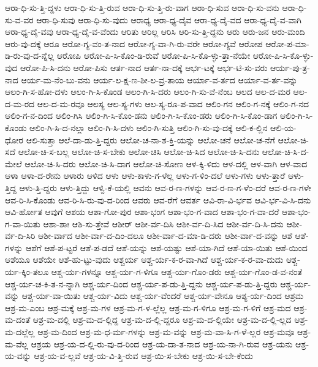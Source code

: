 {ಆರಾ-ಧಿ-ಸು-ತ್ತಿ-ದ್ದಳು
ಆರಾ-ಧಿ-ಸು-ತ್ತಿ-ರುವ
ಆರಾ-ಧಿ-ಸು-ತ್ತಿ-ರು-ವಾಗ
ಆರಾ-ಧಿ-ಸುವ
ಆರಾ-ಧಿ-ಸು-ವನು
ಆರಾ-ಧಿ-ಸು-ವ-ವರ
ಆರಾ-ಧಿ-ಸುವು
ಆರಾ-ಧಿ-ಸು-ವುದು
ಆರಾಧ್ಯ
ಆರಾ-ಧ್ಯ-ದೈವ
ಆರಾ-ಧ್ಯ-ದೈ-ವದ
ಆರಾ-ಧ್ಯ-ದೈ-ವ-ವಾಗಿ
ಆರಾ-ಧ್ಯ-ದೈ-ವವು
ಆರಾ-ಧ್ಯ-ದೈ-ವ-ವೆಂದು
ಆರಿತು
ಆರಿಲ್ಲ
ಆರಿಸಿ
ಆರಿ-ಸು-ತ್ತಿ-ದ್ದನು
ಆರು
ಆರು-ಜನ
ಆರು-ಮಂದಿ
ಆರು-ವು-ದಕ್ಕೆ
ಆರೂ
ಆರೋ-ಗ್ಯ-ವಂ-ತ-ನಾದ
ಆರೋ-ಗ್ಯ-ವಾ-ಗಿ-ರು-ವರೇ
ಆರೋ-ಗ್ಯವೆ
ಆರೋಪ
ಆರೋ-ಪ-ಮಾ-ಡಿ-ರು-ವು-ದ-ನ್ನೆಲ್ಲ
ಆರೋಪಿ
ಆರೋ-ಪಿ-ಸಿ-ಕೊಂ-ಡಿ-ರುವೆ
ಆರೋ-ಪಿ-ಸಿ-ಕೊ-ಳ್ಳು-ತ್ತಾ-ನೆಯೇ
ಆರೋ-ಪಿ-ಸಿ-ಕೊ-ಳ್ಳು-ವುದ
ಆರೋ-ಪಿ-ಸಿ-ದನು
ಆರೋ-ಪಿಸು
ಆರ್ತ-ನಾದ
ಆರ್ತ-ನಾ-ದಕ್ಕೆ
ಆರ್ಭ-ಟಕ್ಕೆ
ಆರ್ಭ-ಟಿ-ಸು-ವರು
ಆರ್ಯ-ಪು-ತ್ರ-ನಾದ
ಆರ್ಯ-ಮ-ನೆಂ-ಬು-ವನು
ಆರ್ಯ-ಲ-ಕ್ಷ-ಣ-ಶೀ-ಲ-ವ್ರ-ತಾಯ
ಆರ್ಯಾ-ವ-ರ್ತದ
ಆರ್ಯಾ-ವ-ರ್ತ-ವನ್ನು
ಆಲಂ-ಗಿ-ಸ-ಹೋ-ದಳು
ಆಲಂ-ಗಿ-ಸಿ-ಕೊಂಡ
ಆಲಂ-ಗಿ-ಸಿ-ದರು
ಆಲಂ-ಗಿ-ಸು-ವೆ-ನೆಂಬ
ಆಲದ
ಆಲ-ದ-ಮರ
ಆಲ-ದ-ಮ-ರದ
ಆಲ-ದ-ಮ-ರವೂ
ಆಲಸ್ಯ
ಆಲ-ಸ್ಯ-ಗಳು
ಆಲ-ಸ್ಯ-ರೂ-ಪ-ವಾದ
ಆಲಿಂ-ಗನ
ಆಲಿಂ-ಗ-ನಕ್ಕೆ
ಆಲಿಂ-ಗ-ನದ
ಆಲಿಂ-ಗ-ನ-ದಿಂದ
ಆಲಿಂ-ಗಿಸಿ
ಆಲಿಂ-ಗಿ-ಸಿ-ಕೊಂ-ಡನು
ಆಲಿಂ-ಗಿ-ಸಿ-ಕೊಂ-ಡರು
ಆಲಿಂ-ಗಿ-ಸಿ-ಕೊಂ-ಡಾಗ
ಆಲಿಂ-ಗಿ-ಸಿ-ಕೊಂಡು
ಆಲಿಂ-ಗಿ-ಸಿ-ದ-ನಲ್ಲಾ
ಆಲಿಂ-ಗಿ-ಸಿ-ದಳು
ಆಲಿಂ-ಗಿ-ಸುತ್ತಿ
ಆಲಿಂ-ಗಿ-ಸು-ವು-ದಕ್ಕೆ
ಆಲಿ-ಕ-ಲ್ಲಿನ
ಆಲಿ-ಯ-ಧೋರ
ಆಲಿ-ಸುತ್ತಾ
ಆಲೆ-ದಾ-ಡು-ತ್ತಿ-ದ್ದರು
ಆಲೋ-ಚ-ನಾ-ಶ-ಕ್ತಿ-ಯನ್ನು
ಆಲೋ-ಚನೆ
ಆಲೋ-ಚ-ನೆಗೆ
ಆಲೋ-ಚಿ-ಸದೆ
ಆಲೋ-ಚಿ-ಸ-ಬಲ್ಲ
ಆಲೋ-ಚಿ-ಸ-ಬೇಕು
ಆಲೋ-ಚಿಸಿ
ಆಲೋ-ಚಿ-ಸಿದ
ಆಲೋ-ಚಿ-ಸಿ-ದನು
ಆಲೋ-ಚಿ-ಸಿ-ದ-ಮೇಲೆ
ಆಲೋ-ಚಿ-ಸಿ-ದರು
ಆಲೋ-ಚಿ-ಸಿ-ದಾಗ
ಆಲೋ-ಚಿ-ಸೋಣ
ಆಳ-ಕ್ಕಿ-ಳಿದು
ಆಳ-ದಲ್ಲಿ
ಆಳ-ವಾಗಿ
ಆಳ-ವಾದ
ಆಳಾ
ಆಳಾ-ದ-ರೇನು
ಆಳಾರು
ಆಳಿದ
ಆಳು
ಆಳು-ಕಾಳು-ಗ-ಳೆಲ್ಲ
ಆಳು-ಗ-ಳಿಂ-ದಲೆ
ಆಳು-ಗಳು
ಆಳು-ತ್ತಾರೆ
ಆಳು-ತ್ತಿದ್ದ
ಆಳು-ತ್ತಿ-ದ್ದರು
ಆಳು-ತ್ತಿದ್ದು
ಆಳ್ವಿ-ಕೆ-ಯಲ್ಲಿ
ಆವನು
ಆವ-ರ-ಣ-ಗಳನ್ನು
ಆವ-ರ-ಣ-ಗ-ಳೆಂ-ದರೆ
ಆವ-ರ-ಣ-ಗಳೇ
ಆವ-ರಿ-ಸಿ-ಕೊಂಡು
ಆವ-ರಿ-ಸಿ-ರು-ವು-ದ-ರಿಂದ
ಆವರು
ಆವ-ರೆಗೆ
ಆವರ್ತ
ಆವಿ-ರಾ-ವಿ-ರ್ಭವ
ಆವಿ-ರ್ಭ-ವಿ-ಸಿ-ದನು
ಆವಿ-ರ್ಹೋತ
ಆವುಗೆ
ಆಶಯ
ಆಶಾ-ಗೋ-ಪುರ
ಆಶಾ-ಭಂಗ
ಆಶಾ-ಭಂ-ಗ-ವಾದ
ಆಶಾ-ಭಂ-ಗ-ವಾ-ದರೆ
ಆಶಾ-ಭಂ-ಗ-ವಾ-ಯಿತು
ಆಶಾ-ಶಾಃ
ಆಶಿ-ಸು-ತ್ತೇವೆ
ಆಶೀರ್
ಆಶೀ-ರ್ವ-ದಿಸಿ
ಆಶೀ-ರ್ವ-ದಿ-ಸಿದ
ಆಶೀ-ರ್ವ-ದಿ-ಸಿ-ದನು
ಆಶೀ-ರ್ವ-ದಿ-ಸಿರಿ
ಆಶೀ-ರ್ವಾದ
ಆಶೀ-ರ್ವಾ-ದ-ದಿಂ-ದಲೂ
ಆಶೀ-ರ್ವಾ-ದ-ಮಾ-ಡಿ-ದರು
ಆಶೀ-ರ್ವಾ-ದ-ವನ್ನು
ಆಶೆ
ಆಶೆ-ಗಳನ್ನು
ಆಶೆಗೆ
ಆಶೆ-ಪ-ಟ್ಟರೆ
ಆಶೆ-ಪ-ಡದೆ
ಆಶೆ-ಯನ್ನು
ಆಶೆ-ಯಷ್ಟು
ಆಶೆ-ಯಾ-ಗಿದೆ
ಆಶೆ-ಯಾ-ಯಿತು
ಆಶೆ-ಯಿಂದ
ಆಶೆಯೂ
ಆಶೆಯೇ
ಆಶೆ-ಹು-ಟ್ಟು-ವುದು
ಆಶ್ಚರ್ಯ
ಆಶ್ಚ-ರ್ಯ-ಕ-ರ-ವಾ-ಗಿದೆ
ಆಶ್ಚ-ರ್ಯ-ಕ-ರ-ವಾ-ದುದು
ಆಶ್ಚ-ರ್ಯ-ಕ್ಕಿಂ-ತಲೂ
ಆಶ್ಚ-ರ್ಯ-ಗಳನ್ನೂ
ಆಶ್ಚ-ರ್ಯ-ಗ-ಳಿಗೂ
ಆಶ್ಚ-ರ್ಯ-ಗೊಂ-ಡರು
ಆಶ್ಚ-ರ್ಯ-ಗೊಂ-ಡ-ವ-ನಂತೆ
ಆಶ್ಚ-ರ್ಯ-ಚ-ಕಿ-ತ-ನ-ನ್ನಾಗಿ
ಆಶ್ಚ-ರ್ಯ-ದಿಂದ
ಆಶ್ಚ-ರ್ಯ-ಪ-ಡು-ತ್ತಿ-ದ್ದನು
ಆಶ್ಚ-ರ್ಯ-ಪ-ಡು-ತ್ತಿ-ದ್ದರು
ಆಶ್ಚ-ರ್ಯ-ವನ್ನು
ಆಶ್ಚ-ರ್ಯ-ವಾ-ಯಿತು
ಆಶ್ಚ-ರ್ಯ-ವಿದು
ಆಶ್ಚ-ರ್ಯ-ವೆಂದರೆ
ಆಶ್ಚ-ರ್ಯ-ವೇನೂ
ಆಶ್ಯ-ರ್ಯ-ದಿಂದ
ಆಶ್ರಮ
ಆಶ್ರ-ಮ-ಎಂಬ
ಆಶ್ರ-ಮಕ್ಕೆ
ಆಶ್ರ-ಮ-ಗಳ
ಆಶ್ರ-ಮ-ಗ-ಳ-ಲ್ಲೆಲ್ಲ
ಆಶ್ರ-ಮ-ಗ-ಳಿಗೂ
ಆಶ್ರ-ಮ-ಗ-ಳಿಗೆ
ಆಶ್ರ-ಮದ
ಆಶ್ರ-ಮ-ದಂತೆ
ಆಶ್ರ-ಮ-ದಲ್ಲಿ
ಆಶ್ರ-ಮ-ದ-ಲ್ಲಿದ್ದ
ಆಶ್ರ-ಮ-ದ-ಲ್ಲಿ-ದ್ದರೂ
ಆಶ್ರ-ಮ-ದ-ಲ್ಲಿಯೇ
ಆಶ್ರ-ಮ-ದ-ಲ್ಲಿ-ಲ್ಲದ
ಆಶ್ರ-ಮ-ದಲ್ಲೆಲ್ಲ
ಆಶ್ರ-ಮ-ದಿಂದ
ಆಶ್ರ-ಮ-ಧ-ರ್ಮ-ಗಳನ್ನು
ಆಶ್ರ-ಮ-ವನ್ನು
ಆಶ್ರ-ಮ-ವಾ-ಸಿ-ಗ-ಳೆ-ಲ್ಲರ
ಆಶ್ರ-ಮವೂ
ಆಶ್ರ-ಮ-ವೆಲ್ಲ
ಆಶ್ರಯ
ಆಶ್ರ-ಯ-ದ-ಲ್ಲಿ-ರು-ವು-ದ-ರಿಂದ
ಆಶ್ರ-ಯ-ದಾ-ತ-ನಾದ
ಆಶ್ರ-ಯ-ನಾ-ಗಿ-ರುವ
ಆಶ್ರ-ಯನು
ಆಶ್ರ-ಯ-ವನ್ನು
ಆಶ್ರ-ಯ-ವ-ಲ್ಲವೆ
ಆಶ್ರ-ಯ-ವಿ-ತ್ತಿ-ರುವ
ಆಶ್ರ-ಯಿ-ಸ-ಬೇಕು
ಆಶ್ರ-ಯಿ-ಸ-ಬೇ-ಕೆಂದು
}
